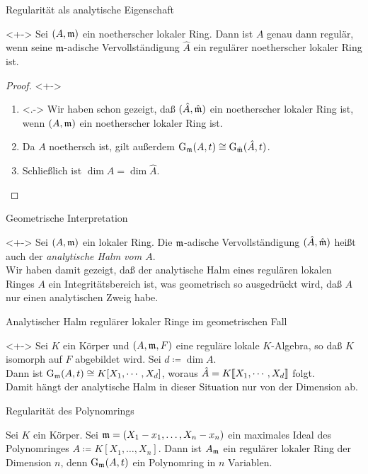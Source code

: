 \begin{frame}{Regularität als analytische Eigenschaft}
	\begin{proposition}<+->
		Sei \((A, \mathfrak{m})\) ein noetherscher lokaler Ring. Dann ist \(A\)
		genau dann regulär, wenn seine \(\mathfrak{m}\)-adische Vervollständigung
		\(\hat A\) ein regulärer noetherscher lokaler Ring ist.
	\end{proposition}
	\begin{proof}<+->
		\begin{enumerate}[<+->]
		\item<.->
			Wir haben schon gezeigt, daß \((\hat A, \hat{\mathfrak{m}})\) ein noetherscher 
			lokaler Ring ist, wenn \((A, \mathfrak{m})\) ein noetherscher lokaler Ring
			ist.
		\item
			Da \(A\) noethersch ist, gilt außerdem
			\(\operatorname{G}_{\mathfrak{m}}(A, t) \cong \operatorname{G}_{\hat{\mathfrak{m}}}(\hat A, t)\). 
		\item
			Schließlich ist \(\dim A = \dim{\hat A}\).
			\qedhere
		\end{enumerate}
	\end{proof}
\end{frame}

\begin{frame}{Geometrische Interpretation}
	\begin{remark}<+->
		Sei \((A, \mathfrak{m})\) ein lokaler Ring. Die \(\mathfrak{m}\)-adische
		Vervollständigung \((\hat A, \hat{\mathfrak{m}})\) heißt auch der
		\emph{analytische Halm vom \(A\)}. 
		\\
		Wir haben damit gezeigt, daß der analytische Halm eines regulären
		lokalen Ringes \(A\) ein Integritätsbereich ist, was geometrisch so
		ausgedrückt wird, daß \(A\) nur einen analytischen Zweig habe. 
	\end{remark}
\end{frame}

\begin{frame}{Analytischer Halm regulärer lokaler Ringe im geometrischen Fall}
	\begin{example}<+->
		Sei \(K\) ein Körper und \((A, \mathfrak{m}, F)\) eine reguläre lokale
		\(K\)-Algebra, so daß \(K\) isomorph auf \(F\) abgebildet wird. 
		Sei \(d \coloneqq \dim A\).
		\\
		Dann ist \(\operatorname{G}_{\mathfrak{m}}(A, t) \cong K[X_1, \dotsb, X_d]\),
		woraus \(\hat A = K\llbracket X_1, \dotsb, X_d\rrbracket\) folgt.
		\\
		Damit hängt der analytische Halm in dieser Situation nur von der Dimension
		ab.
	\end{example}
\end{frame}

\begin{frame}{Regularität des Polynomrings}
	\begin{example}
		Sei \(K\) ein Körper. Sei \(\mathfrak{m} = (X_1 - x_1, \dotsc, X_n - x_n)\) ein
		maximales Ideal des Polynomringes \(A \coloneqq K[X_1, \dotsc, X_n]\).
		Dann ist \(A_{\mathfrak{m}}\) ein regulärer lokaler Ring der
		Dimension \(n\), denn
		\(\operatorname{G}_{\mathfrak{m}}(A, t)\) ein Polynomring in \(n\) Variablen.
	\end{example}
\end{frame}

